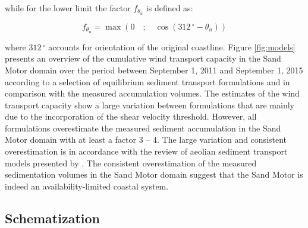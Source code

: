 \noindent while for the lower limit the factor $f_{\theta_u}$ is defined
as:

\begin{equation}
  f_{\theta_u} = \max \left( 0 \quad ; \quad \cos \left( 312\,^{\circ} - \theta_u \right) \right)
\end{equation}

\noindent where $312\,^{\circ}$ accounts for orientation of the original
coastline.  Figure \ref{fig:models} presents an overview of the
cumulative wind transport capacity in the Sand Motor domain over the
period between September 1, 2011 and September 1, 2015 according to a
selection of equilibrium sediment transport formulations and in
comparison with the measured accumulation volumes. The estimates of
the wind transport capacity show a large variation between
formulations that are mainly due to the incorporation of the shear
velocity threshold. However, all formulations overestimate the
measured sediment accumulation in the Sand Motor domain with at least
a factor 3 -- 4. The large variation and consistent overestimation is
in accordance with the review of aeolian sediment transport models
presented by \citet{Sherman2012}. The consistent overestimation of the
measured sedimentation volumes in the Sand Motor domain suggest that
the Sand Motor is indeed an availability-limited coastal system.

\subsection{Schematization}

